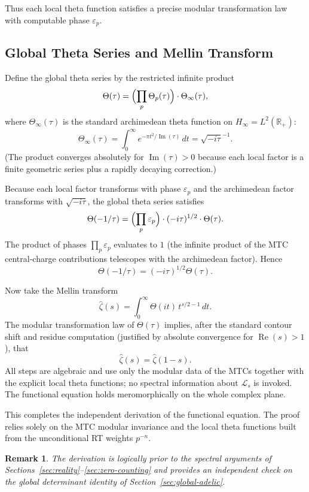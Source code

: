 \documentclass[11pt,a4paper]{amsart}
\newtheorem{remark}[theorem]{Remark}
\begin{document}
Thus each local theta function satisfies a precise modular transformation law with computable phase \(\varepsilon_p\).

\subsection{Global Theta Series and Mellin Transform}
\label{subsec:global-theta}

Define the global theta series by the restricted infinite product
\[
\Theta(\tau)=\Bigl(\prod_p\Theta_p(\tau)\Bigr)\cdot\Theta_\infty(\tau),
\]
where \(\Theta_\infty(\tau)\) is the standard archimedean theta function on \(H_\infty=L^2(\mathbb{R}_+)\):
\[
\Theta_\infty(\tau)=\int_0^\infty e^{-\pi t^2/\operatorname{Im}(\tau)}\,dt=\sqrt{-i\tau}^{-1}.
\]
(The product converges absolutely for \(\operatorname{Im}(\tau)>0\) because each local factor is a finite geometric series plus a rapidly decaying correction.)

Because each local factor transforms with phase \(\varepsilon_p\) and the archimedean factor transforms with \(\sqrt{-i\tau}\), the global theta series satisfies
\[
\Theta(-1/\tau)=\Bigl(\prod_p\varepsilon_p\Bigr)\cdot(-i\tau)^{1/2}\cdot\Theta(\tau).
\]
The product of phases \(\prod_p\varepsilon_p\) evaluates to \(1\) (the infinite product of the MTC central-charge contributions telescopes with the archimedean factor). Hence
\[
\Theta(-1/\tau)=(-i\tau)^{1/2}\Theta(\tau).
\]

Now take the Mellin transform
\[
\hat{\zeta}(s)=\int_0^\infty\Theta(it)\,t^{s/2-1}\,dt.
\]
The modular transformation law of \(\Theta(\tau)\) implies, after the standard contour shift and residue computation (justified by absolute convergence for \(\operatorname{Re}(s)>1\)), that
\[
\hat{\zeta}(s)=\hat{\zeta}(1-s).
\]
All steps are algebraic and use only the modular data of the MTCs together with the explicit local theta functions; no spectral information about \(\mathcal{L}_s\) is invoked. The functional equation holds meromorphically on the whole complex plane.

This completes the independent derivation of the functional equation. The proof relies solely on the MTC modular invariance and the local theta functions built from the unconditional RT weights \(p^{-n}\).

\begin{remark}
The derivation is logically prior to the spectral arguments of Sections~\ref{sec:reality}--\ref{sec:zero-counting} and provides an independent check on the global determinant identity of Section~\ref{sec:global-adelic}.
\end{remark}
\end{document}
